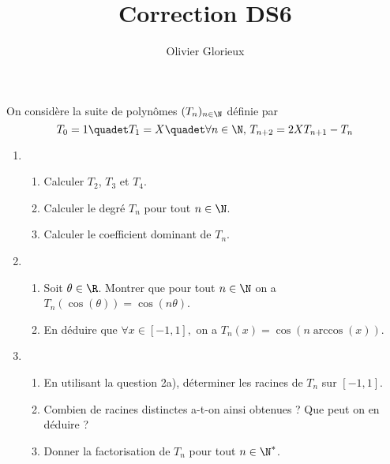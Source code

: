 \documentclass[a4paper, 11pt,reqno]{article}
\author{Olivier Glorieux}
\begin{document}
\title{Correction DS6
}








\begin{exercice}
On considère la suite de polynômes $(T_n)_{n\in \N}$ définie par 
$$ T_0=1 \quadet T_1=X \quadet \forall n\in \N,\, T_{n+2}=2X T_{n+1}-T_n$$
\begin{enumerate}
\item \begin{enumerate}
\item Calculer $T_2$, $T_3$ et $T_4$.
\item Calculer le degré  $T_n$ pour tout $n\in\N$. 
\item Calculer le coefficient dominant de $T_n$. 
\end{enumerate}
\item \begin{enumerate}
\item Soit $\theta \in \R$. Montrer que pour tout $n\in \N$ on  a  $T_n(\cos(\theta)) =\cos(n\theta)$.
\item En déduire que $\forall x\in [-1,1], $ on a $T_n(x) =\cos(n \arccos(x))$. 
\end{enumerate}
\item \begin{enumerate}
\item En utilisant la question 2a), déterminer les racines de $T_n$ sur $[-1,1]$. 
\item Combien de racines distinctes a-t-on ainsi obtenues ? Que peut on en déduire ? 
\item Donner la factorisation de $T_n$ pour tout $n\in \N^*$. 
\end{enumerate}
\end{enumerate}
\end{exercice}
\end{document}
